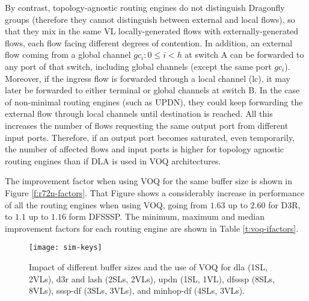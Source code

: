 \documentclass[review]{elsarticle}
\newcommand{\dfly}{Dragonfly}
\begin{document}
By contrast, topology-agnostic routing engines do not distinguish \dfly{} groups (therefore they cannot distinguish between external and local flows),
so that they mix in the same VL locally-generated flows with externally-generated flows, each flow facing different degrees of contention.
In addition, an external flow coming from a global channel $gc_i : 0 \le i < h$ at switch A can be forwarded to any port of that switch, including global channels (except the same port $gc_i$).
Moreover, if the ingress flow is forwarded through a local channel (lc), it may later be forwarded to either terminal or global channels at switch B.
In the case of non-minimal routing engines (such as UPDN), they could keep forwarding the external flow through local channels until destination is reached.
All this increases the number of flows requesting the same output port from different input ports.
Therefore, if an output port becomes saturated, even temporarily, the number of affected flows and input ports is higher for topology agnostic routing engines
than if DLA is used in VOQ architectures.

The improvement factor when using VOQ for the same buffer size is shown in Figure \ref{f:r72n-factors}.
That Figure shows a considerably increase in performance of all the routing engines when using VOQ, going from $1.63$ up to $2.60$ for D3R, to
$1.1$ up to $1.16$ form DFSSSP. The minimum, maximum and median improvement factors for each routing engine are shown in Table \ref{t:voq-ifactors}.

\begin{figure}[!htbp]
        \centering
        \texttt{[image: sim-keys]}

                 
                 

        \caption{Impact of different buffer sizes and the use of VOQ for dla (1SL, 2VLs), d3r and lash (2SLs, 2VLs), updn (1SL, 1VL), dfsssp (8SLs, 8VLs), sssp-df (3SLs, 3VLs), and minhop-df (4SLs, 3VLs).}

        \label{f:sim-factors}
\end{figure}
\end{document}
